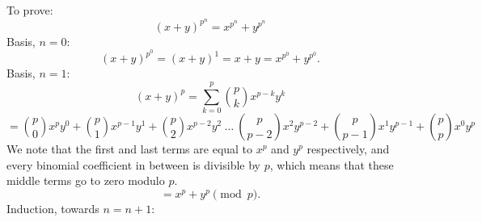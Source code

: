 \documentclass{article}
\begin{document}
To prove:
\[ (x+y)^{p^n} = x^{p^n} + y^{p^n} \]
Basis, $n=0$:
\[ (x+y)^{p^0} = (x+y)^1 = x + y = x^{p^0} + y^{p^0}. \]
Basis, $n=1$:
\[ (x+y)^p = \sum_{k=0}^{p} {p \choose k} x^{p-k} y^{k}  \]
\[ = {p \choose 0} x^{p} y^{0} + {p \choose 1} x^{p-1} y^{1} + {p \choose 2} x^{p-2} y^{2}~ \dots~{p \choose p-2} x^{2} y^{p-2} + {p \choose p-1} x^{1} y^{p-1} + {p \choose p} x^{0} y^{p} \]
We note that the first and last terms are equal to $x^p$ and $y^p$ respectively, and every binomial coefficient in between is divisible by $p$, which means that these middle terms go to zero modulo $p$.
\[ = x^{p} + y^{p} \pmod p. \]
Induction, towards $n=n+1$:
\end{document}
